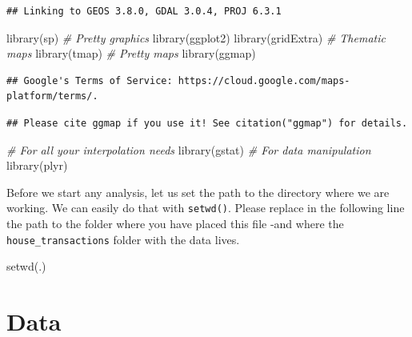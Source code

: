 \documentclass[
]{book}
\newenvironment{Shaded}{\begin{snugshade}}{\end{snugshade}}
\newcommand{\CommentTok}[1]{\textcolor[rgb]{0.56,0.35,0.01}{\textit{#1}}}
\newcommand{\FunctionTok}[1]{\textcolor[rgb]{0.00,0.00,0.00}{#1}}
\newcommand{\NormalTok}[1]{#1}
\newcommand{\StringTok}[1]{\textcolor[rgb]{0.31,0.60,0.02}{#1}}
\begin{document}
\begin{verbatim}
## Linking to GEOS 3.8.0, GDAL 3.0.4, PROJ 6.3.1
\end{verbatim}

\begin{Shaded}
\begin{Highlighting}[]
\FunctionTok{library}\NormalTok{(sp)}
\CommentTok{\# Pretty graphics}
\FunctionTok{library}\NormalTok{(ggplot2)}
\FunctionTok{library}\NormalTok{(gridExtra)}
\CommentTok{\# Thematic maps}
\FunctionTok{library}\NormalTok{(tmap)}
\CommentTok{\# Pretty maps}
\FunctionTok{library}\NormalTok{(ggmap)}
\end{Highlighting}
\end{Shaded}

\begin{verbatim}
## Google's Terms of Service: https://cloud.google.com/maps-platform/terms/.
\end{verbatim}

\begin{verbatim}
## Please cite ggmap if you use it! See citation("ggmap") for details.
\end{verbatim}

\begin{Shaded}
\begin{Highlighting}[]
\CommentTok{\# For all your interpolation needs}
\FunctionTok{library}\NormalTok{(gstat)}
\CommentTok{\# For data manipulation}
\FunctionTok{library}\NormalTok{(plyr)}
\end{Highlighting}
\end{Shaded}

Before we start any analysis, let us set the path to the directory where we are working. We can easily do that with \texttt{setwd()}. Please replace in the following line the path to the folder where you have placed this file -and where the \texttt{house\_transactions} folder with the data lives.

\begin{Shaded}
\begin{Highlighting}[]
\FunctionTok{setwd}\NormalTok{(}\StringTok{\textquotesingle{}.\textquotesingle{}}\NormalTok{)}
\end{Highlighting}
\end{Shaded}

\hypertarget{data}{%
\section{Data}\label{data}}
\end{document}
